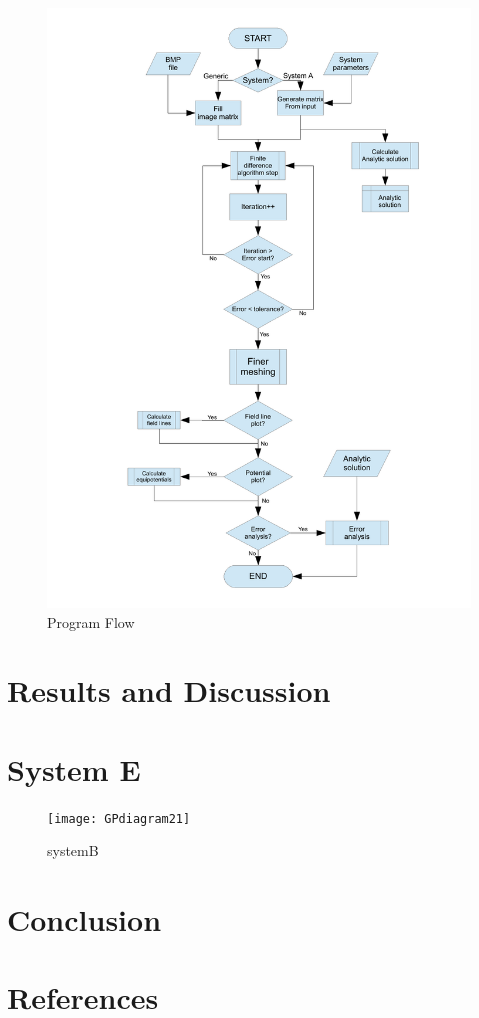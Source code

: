 \documentclass[a4paper]{jpconf}
\begin{document}
\begin{figure}[h]
	\centering
	\includegraphics[width=13cm]{progflow} 
	\caption{Program Flow}
	\label{fig:prog}
\end{figure}

\section*{Results and Discussion}

\section*{System E}


\begin{figure}[h]
	\centering
	\texttt{[image: GPdiagram21]} 
	\caption{systemB}
	\label{fig:systemB}
\end{figure}

\section*{Conclusion}

\section*{References}


\end{document}
